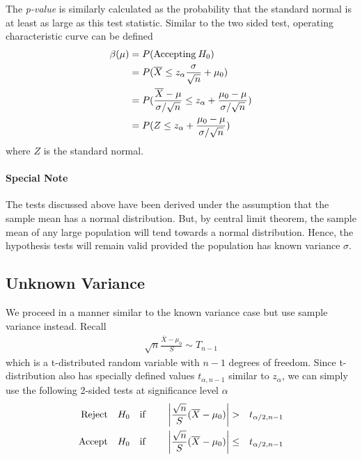 \documentclass[../probability-notes.tex]{subfiles}
\begin{document}
    The \emph{p-value} is similarly calculated as the probability that the standard normal is at least as large as this test statistic. Similar to the two sided test, operating characteristic curve can be defined
    \begin{align*}
        \beta(\mu) &= P(\text{Accepting\:} H_{0})\\
        &= P(\overline{X} \leq z_{\alpha}\frac{\sigma}{\sqrt{n}} + \mu_{0})\\
        &= P(\frac{\overline{X} - \mu}{\sigma/\sqrt{n}} \leq z_{\alpha} + \frac{\mu_{0} - \mu}{\sigma/\sqrt{n}})\\
        &= P(Z \leq z_{\alpha} + \frac{\mu_{0} - \mu}{\sigma/\sqrt{n}})
    \end{align*}
    where $Z$ is the standard normal.\newline

    \paragraph{Special Note} The tests discussed above have been derived under the assumption that the sample mean has a normal distribution. But, by central limit theorem, the sample mean of any large population will tend towards a normal distribution. Hence, the hypothesis tests will remain valid provided the population has known variance $\sigma$.

    \subsection{Unknown Variance}\label{mean_normal_unknown_variance}
    We proceed in a manner similar to the known variance case but use sample variance instead. Recall
    \begin{align*}
        \sqrt{n} \frac{\overline{X} - \mu_{0}}{S} \sim T_{n-1}
    \end{align*}
    which is a t-distributed random variable with $n-1$ degrees of freedom. Since t-distribution also has specially defined values $t_{\alpha, n-1}$ similar to $z_{\alpha}$, we can simply use the following 2-sided tests at significance level $\alpha$
    \begin{alignat*}{4}
        \text{Reject\quad} &H_{0} \text{\quad if \quad} &\bigg \lvert\frac{\sqrt{n}}{S}(\overline{X} - \mu_{0}) \bigg\rvert &> &t_{\alpha/2, n-1}\\
        \text{Accept\quad} &H_{0} \text{\quad if\quad} &\bigg \lvert\frac{\sqrt{n}}{S}(\overline{X} - \mu_{0}) \bigg\rvert &\leq &t_{\alpha/2, n-1}\\
    \end{alignat*}
\end{document}
